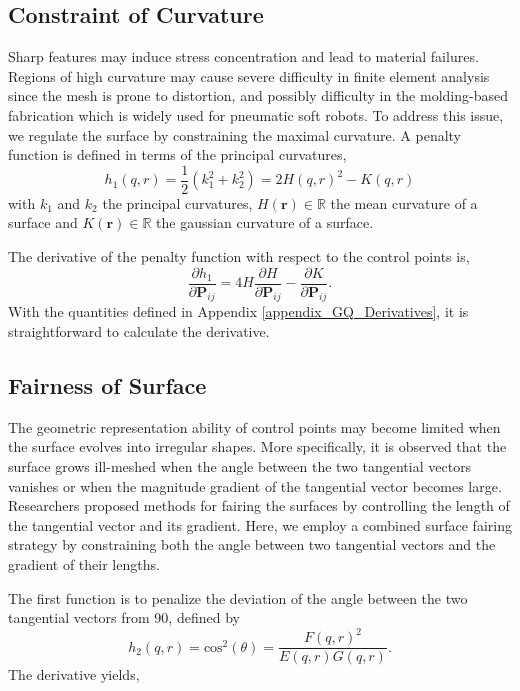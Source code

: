 \documentclass[journal]{IEEEtran}
\renewcommand{\vec}[1]{\mathbf{#1}}
\theoremstyle{definition}
\renewcommand{\vec}[1]{\mathbf{#1}}
\begin{document}
\subsection{Constraint of Curvature}
Sharp features may induce stress concentration and lead to material failures. Regions of high curvature may cause severe difficulty in finite element analysis since the mesh is prone to distortion\cite{guzman2018analysis}, and possibly difficulty in the molding-based fabrication which is widely used for pneumatic soft robots. To address this issue, we regulate the surface by constraining the maximal curvature. A penalty function is defined in terms of the principal curvatures,
\begin{equation} \label{Constraint_curvature1}
  h_1(q,r) =\frac{1}{2}(k_1^2+k_2^2) = 2H(q,r)^2 - K(q,r)
\end{equation}
with $k_1$ and $k_2$ the principal curvatures, $H(\vec{r})\in\mathbb{R}$ the mean curvature of a surface and $K(\vec{r})\in\mathbb{R}$ the gaussian curvature of a surface.

The derivative of the penalty function with respect to the control points is,
\begin{equation}\label{curv_deri}
  \frac{\partial h_1}{\partial {\mathbf{P}}_{ij}} =  4H\frac{\partial H}{\partial {\mathbf{P}}_{ij}}  - \frac{\partial K}{\partial {\mathbf{P}}_{ij}}.
\end{equation}
With the quantities defined in Appendix \ref{appendix_GQ_Derivatives}, it is straightforward to calculate the derivative.

\subsection{Fairness of Surface}
The geometric representation ability of control points may become limited when the surface evolves into irregular shapes. More specifically, it is observed that the surface grows ill-meshed when the angle between the two tangential vectors vanishes or when the magnitude gradient of the tangential vector becomes large. Researchers proposed methods for fairing the surfaces by controlling the length of the tangential vector and its gradient\cite{vassilev1996fair, lott1988method, kineri2012b}. Here, we employ a combined surface fairing strategy by constraining both the angle between two tangential vectors and the gradient of their lengths.

The first function is to penalize the deviation of the angle between the two tangential vectors from 90\degree, defined by
\begin{equation} \label{Constraint_curvature2}
  h_2(q,r) = \text{cos}^2(\theta) = \frac{F(q,r)^2}{E(q,r)G(q,r)}.
\end{equation}
The derivative yields,
\end{document}
